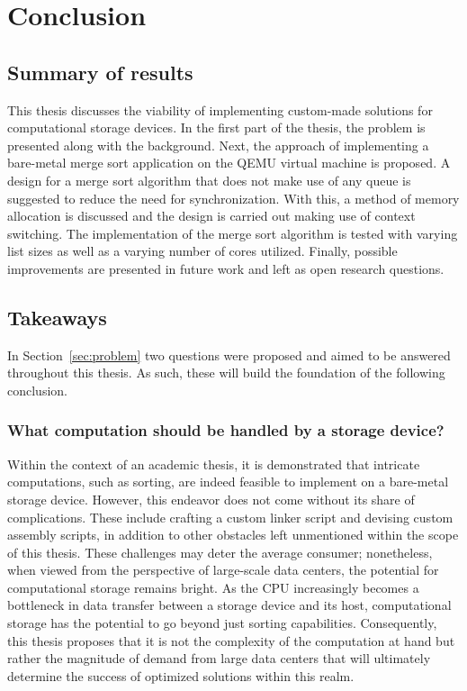 \section{Conclusion}
\subsection{Summary of results}
This thesis discusses the viability of implementing custom-made solutions for
computational storage devices. In the first part of the thesis, the problem is
presented along with the background. Next, the approach of implementing a
bare-metal merge sort application on the QEMU virtual machine is proposed. A
design for a merge sort algorithm that does not make use of any queue is
suggested to reduce the need for synchronization. With this, a method of memory
allocation is discussed and the design is carried out making use of context
switching. The implementation of the merge sort algorithm is tested with varying
list sizes as well as a varying number of cores utilized. Finally, possible
improvements are presented in future work and left as open research questions.

\subsection{Takeaways}
In Section~\ref{sec:problem} two questions were proposed and aimed to be
answered throughout this thesis. As such, these will build the foundation of the
following conclusion.

\subsubsection*{What computation should be handled by a storage device?}
Within the context of an academic thesis, it is demonstrated that intricate
computations, such as sorting, are indeed feasible to implement on a bare-metal
storage device. However, this endeavor does not come without its share of
complications. These include crafting a custom linker script and devising custom
assembly scripts, in addition to other obstacles left unmentioned within the
scope of this thesis. These challenges may deter the average consumer;
nonetheless, when viewed from the perspective of large-scale data centers, the
potential for computational storage remains bright. As the CPU increasingly
becomes a bottleneck in data transfer between a storage device and its host,
computational storage has the potential to go beyond just sorting capabilities.
Consequently, this thesis proposes that it is not the complexity of the
computation at hand but rather the magnitude of demand from large data centers
that will ultimately determine the success of optimized solutions within this
realm.


